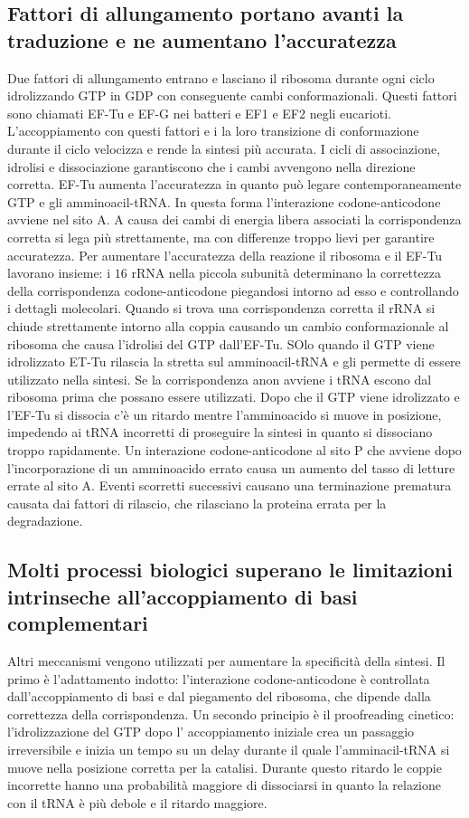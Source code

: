 \subsection{Fattori di allungamento portano avanti la traduzione e ne aumentano l'accuratezza}
Due fattori di allungamento entrano e lasciano il ribosoma durante ogni ciclo idrolizzando GTP in GDP con conseguente cambi conformazionali. Questi fattori sono chiamati EF-Tu e EF-G nei
batteri e EF1 e EF2 negli eucarioti. L'accoppiamento con questi fattori e i la loro transizione di conformazione durante il ciclo velocizza e rende la sintesi pi\`u accurata. I cicli di
associazione, idrolisi e dissociazione garantiscono che i cambi avvengono nella direzione corretta. EF-Tu aumenta l'accuratezza in quanto pu\`o legare contemporaneamente GTP e gli 
amminoacil-tRNA. In questa forma l'interazione codone-anticodone avviene nel sito A. A causa dei cambi di energia libera associati la corrispondenza corretta si lega pi\`u strettamente,
ma con differenze troppo lievi per garantire accuratezza. Per aumentare l'accuratezza della reazione il ribosoma e il EF-Tu lavorano insieme: i $16$ rRNA nella piccola subunit\`a 
determinano la correttezza della corrispondenza codone-anticodone piegandosi intorno ad esso e controllando i dettagli molecolari. Quando si trova una corrispondenza corretta il rRNA
si chiude strettamente intorno alla coppia causando un cambio conformazionale al ribosoma che causa l'idrolisi del GTP dall'EF-Tu. SOlo quando il GTP viene idrolizzato  ET-Tu rilascia 
la stretta sul amminoacil-tRNA e gli permette di essere utilizzato nella sintesi. Se la corrispondenza anon avviene i tRNA escono dal ribosoma prima che possano essere utilizzati. Dopo
che il GTP viene idrolizzato e l'EF-Tu si dissocia c'\`e un ritardo mentre l'amminoacido si muove in posizione, impedendo ai tRNA incorretti di proseguire la sintesi in quanto si
dissociano troppo rapidamente. Un interazione codone-anticodone al sito P che avviene dopo l'incorporazione di un amminoacido errato causa un aumento del tasso di letture errate al 
sito A. Eventi scorretti successivi causano una terminazione prematura causata dai fattori di rilascio, che rilasciano la proteina errata per la degradazione. 
\subsection{Molti processi biologici superano le limitazioni intrinseche all'accoppiamento di basi complementari}
Altri meccanismi vengono utilizzati per aumentare la specificit\`a della sintesi. Il primo \`e l'adattamento indotto: l'interazione codone-anticodone \`e controllata dall'accoppiamento
di basi e dal piegamento del ribosoma, che dipende dalla correttezza della corrispondenza. Un secondo principio \`e il proofreading cinetico: l'idrolizzazione del GTP dopo l'
accoppiamento iniziale crea un passaggio irreversibile e inizia un tempo su un delay durante il quale l'amminacil-tRNA si muove nella posizione corretta per la catalisi. Durante questo
ritardo le coppie incorrette hanno una probabilit\`a maggiore di dissociarsi in quanto la relazione con il tRNA \`e pi\`u debole e il ritardo maggiore. 

